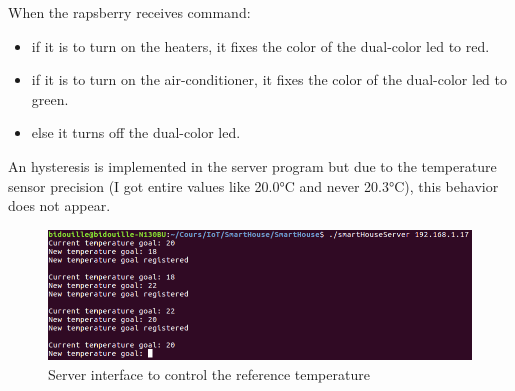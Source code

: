 \documentclass[10pt]{article}
\begin{document}
When the rapsberry receives command:
\begin{itemize}
\item if it is to turn on the heaters, it fixes the color of the dual-color led to red.
\item if it is to turn on the air-conditioner, it fixes the color of the dual-color led to green.
\item else it turns off the dual-color led.
\end{itemize}

An hysteresis is implemented in the server program but due to the temperature sensor precision (I got entire values like 20.0°C and never 20.3°C), this behavior does not appear.

\begin{figure}[H]
  \centering
  \includegraphics[width=\textwidth]{../imgs/serverInterface.png}
  \caption{\label{serverInterface}Server interface to control the reference temperature}
\end{figure}
\end{document}
